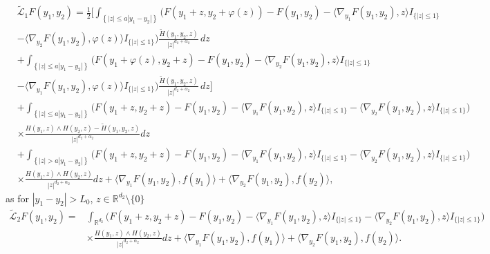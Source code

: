 \documentclass[11pt,reqno]{amsart}
\numberwithin{equation}{section}
\newcommand{\R}{\mathbb{R}}
\begin{document}
\begin{align*}
&\widetilde{\mathcal{L}}_1F(y_1,y_2)
=\frac{1}{2}\bigg[\int_{\left\{|z|\le a|y_1-y_2| \right\}} \Big(F(y_1+z,y_2+\varphi(z))-F(y_1,y_2)-\langle \nabla_{y_1}F(y_1,y_2),z\rangle I_{\{|z|\le1\}}\\
&-\langle \nabla_{y_2}F(y_1,y_2),\varphi(z)\rangle  I_{\{|z|\le1\}}\Big)\frac{\widetilde{H}(y_1,y_2,z)}{|z|^{d_2+\alpha_2}}\,dz\\
&+\int_{\left\{|z|\le  a|y_1-y_2|\right\}}\!\! \Big(F(y_1+\varphi(z),y_2+z)-F(y_1,y_2)-\langle \nabla_{y_2}F(y_1,y_2),z\rangle I_{\{|z|\le1\}}\\
&-\langle \nabla_{y_1}F(y_1,y_2), \varphi(z)\rangle  I_{\{|z|\le1\}}\Big)\frac{\widetilde{H}(y_1,y_2,z)}{|z|^{d_2+\alpha_2}}\,dz\bigg]\\
&+\int_{\left\{|z|\le  a|y_1-y_2|\right\}}\Big(F(y_1+z,y_2+z)-F(y_1,y_2)-\langle \nabla_{y_1}F(y_1,y_2), z\rangle  I_{\{|z|\le1\}}-\langle \nabla_{y_2}F(y_1,y_2), z\rangle  I_{\{|z|\le1\}}\Big)\\
&\times\frac{H(y_1,z)\wedge H(y_2,z)-\widetilde{H}(y_1,y_2,z)}{|z|^{d_2+\alpha_2}}dz\\
&+\int_{\left\{|z|> a|y_1-y_2|\right\}}\Big(F(y_1+z,y_2+z)-F(y_1,y_2)-\langle \nabla_{y_1}F(y_1,y_2), z\rangle I_{\{|z|\le1\}}-\langle \nabla_{y_2}F(y_1,y_2), z\rangle  I_{\{|z|\le1\}}\Big)\\
&\times\frac{H(y_1,z)\wedge H(y_2,z)}{|z|^{d_2+\alpha_2}}dz+\langle \nabla_{y_1}F(y_1,y_2),f(y_1)\rangle +\langle \nabla_{y_2}F(y_1,y_2),f(y_2)\rangle,
\end{align*}
as for $|y_1-y_2|> L_0$,  $ z\in\R^{d_2}\setminus\{0\}$
\begin{align*}
\widetilde{\mathcal{L}}_2F(y_1,y_2)=&\int_{\R^{d_2}}\Big(F(y_1+z,y_2+z)-F(y_1,y_2)-\langle \nabla_{y_1}F(y_1,y_2), z\rangle I_{\{|z|\le1\}}-\langle \nabla_{y_2}F(y_1,y_2), z\rangle  I_{\{|z|\le1\}}\Big)\\
&\times\frac{H(y_1,z)\wedge H(y_2,z)}{|z|^{d_2+\alpha_2}}dz+\langle \nabla_{y_1}F(y_1,y_2),f(y_1)\rangle +\langle \nabla_{y_2}F(y_1,y_2),f(y_2)\rangle.
\end{align*}
\end{document}
